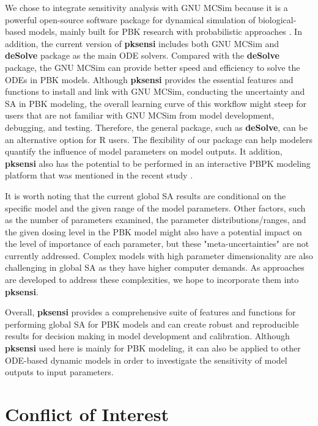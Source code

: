 \documentclass[preprint,12pt, a4paper]{elsarticle}
\begin{document}
We chose to integrate sensitivity analysis with GNU MCSim because it is a powerful open-source software package for dynamical simulation of biological-based models, mainly built for PBK research with probabilistic approaches \cite{bois2009gnu}. In addition, the current version of \textbf{pksensi} includes both GNU MCSim and \textbf{deSolve} package as the main ODE solvers. Compared with the \textbf{deSolve} package, the GNU MCSim can provide better speed and efficiency to solve the ODEs in PBK models. Although \textbf{pksensi} provides the essential features and functions to install and link with GNU MCSim, conducting the uncertainty and SA in PBK modeling, the overall learning curve of this workflow might steep for users that are not familiar with GNU MCSim from model development, debugging, and testing. Therefore, the general package, such as \textbf{deSolve}, can be an alternative option for R users. The flexibility of our package can help modelers quantify the influence of model parameters on model outputs. It addition, \textbf{pksensi} also has the potential to be performed in an interactive PBPK modeling platform that was mentioned in the recent study \cite{li2019integration}.

It is worth noting that the current global SA results are conditional on the specific model and the given range of the model parameters. Other factors, such as the number of parameters examined, the parameter distributions/ranges, and the given dosing level in the PBK model might also have a potential impact on the level of importance of each parameter, but these "meta-uncertainties" are not currently addressed. Complex models with high parameter dimensionality are also challenging in global SA as they have higher computer demands. As approaches are developed to address these complexities, we hope to incorporate them into \textbf{pksensi}.

Overall, \textbf{pksensi} provides a comprehensive suite of features and functions for performing global SA for PBK models and can create robust and reproducible results for decision making in model development and calibration. Although \textbf{pksensi} used here is mainly for PBK modeling, it can also be applied to other ODE-based dynamic models in order to investigate the sensitivity of model outputs to input parameters.

\section*{Conflict of Interest}
\end{document}
